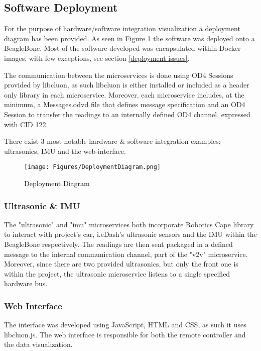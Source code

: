 \documentclass[12pt]{article}
\begin{document}
\subsection{Software Deployment}
For the purpose of hardware/software integration visualization a deployment diagram has been provided. As seen in Figure \ref{fig:deploymentdiagram} the software was deployed onto a BeagleBone. Most of the software developed was encapsulated within Docker images, with few exceptions, see section \ref{deployment issues}. \par

The communication between the microservices is done using OD4 Sessions provided by libcluon\cite{libcluon}, as such libcluon is either installed or included as a header only library in each microservice. Moreover, each microservice includes, at the minimum, a Messages.odvd file that defines message specification and an OD4 Session to transfer the readings to an internally defined OD4 channel, expressed with CID 122. \par
There exist 3 most notable hardware \& software integration examples; ultrasonics, IMU and the web-interface.\par

\FloatBarrier %
\begin{figure}[ht!]
\centering
\texttt{[image: Figures/DeploymentDiagram.png]}
\caption{Deployment Diagram}
\label{fig:deploymentdiagram}
\end{figure}
\FloatBarrier %

\subsubsection{Ultrasonic \& IMU}
The "ultrasonic" and "imu" microservices both incorporate Robotics Cape\cite{robotics cape} library to interact with project's car, i.eDash's ultrasonic sensors and the IMU within the BeagleBone respectively. The readings are then sent packaged in a defined message to the internal communication channel, part of the "v2v" microservice. Moreover, since there are two provided ultrasonics, but only the front one is within the project, the ultrasonic microservice listens to a single specified hardware bus. 

\subsubsection{Web Interface}
The interface was developed using JavaScript, HTML and CSS, as such it uses libcluon.js. The web interface is responsible for both the remote controller and the data visualization. \par
\end{document}
